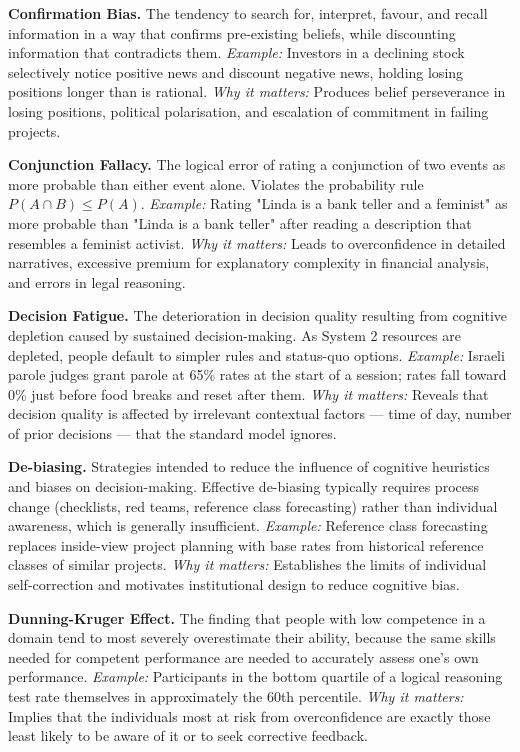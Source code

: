 \documentclass[12pt, letterpaper]{article}
\begin{document}
\textbf{Confirmation Bias.} The tendency to search for, interpret, favour, and recall information in a way that confirms pre-existing beliefs, while discounting information that contradicts them. \textit{Example:} Investors in a declining stock selectively notice positive news and discount negative news, holding losing positions longer than is rational. \textit{Why it matters:} Produces belief perseverance in losing positions, political polarisation, and escalation of commitment in failing projects.

\textbf{Conjunction Fallacy.} The logical error of rating a conjunction of two events as more probable than either event alone. Violates the probability rule $P(A \cap B) \leq P(A)$. \textit{Example:} Rating "Linda is a bank teller and a feminist" as more probable than "Linda is a bank teller" after reading a description that resembles a feminist activist. \textit{Why it matters:} Leads to overconfidence in detailed narratives, excessive premium for explanatory complexity in financial analysis, and errors in legal reasoning.

\textbf{Decision Fatigue.} The deterioration in decision quality resulting from cognitive depletion caused by sustained decision-making. As System 2 resources are depleted, people default to simpler rules and status-quo options. \textit{Example:} Israeli parole judges grant parole at 65\% rates at the start of a session; rates fall toward 0\% just before food breaks and reset after them. \textit{Why it matters:} Reveals that decision quality is affected by irrelevant contextual factors --- time of day, number of prior decisions --- that the standard model ignores.

\textbf{De-biasing.} Strategies intended to reduce the influence of cognitive heuristics and biases on decision-making. Effective de-biasing typically requires process change (checklists, red teams, reference class forecasting) rather than individual awareness, which is generally insufficient. \textit{Example:} Reference class forecasting replaces inside-view project planning with base rates from historical reference classes of similar projects. \textit{Why it matters:} Establishes the limits of individual self-correction and motivates institutional design to reduce cognitive bias.

\textbf{Dunning-Kruger Effect.} The finding that people with low competence in a domain tend to most severely overestimate their ability, because the same skills needed for competent performance are needed to accurately assess one's own performance. \textit{Example:} Participants in the bottom quartile of a logical reasoning test rate themselves in approximately the 60th percentile. \textit{Why it matters:} Implies that the individuals most at risk from overconfidence are exactly those least likely to be aware of it or to seek corrective feedback.
\end{document}
